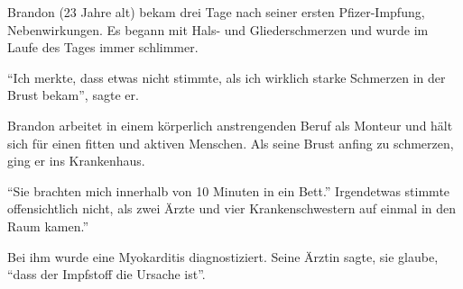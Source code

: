 Brandon (23 Jahre alt) bekam drei Tage nach seiner ersten Pfizer-Impfung,
Nebenwirkungen. Es begann mit Hals- und Gliederschmerzen und wurde im Laufe des
Tages immer schlimmer.

``Ich merkte, dass etwas nicht stimmte, als ich wirklich starke Schmerzen in der
Brust bekam'', sagte er.

Brandon arbeitet in einem körperlich anstrengenden Beruf als Monteur und hält
sich für einen fitten und aktiven Menschen. Als seine Brust anfing zu schmerzen,
ging er ins Krankenhaus.

``Sie brachten mich innerhalb von 10 Minuten in ein Bett.'' Irgendetwas stimmte
offensichtlich nicht, als zwei Ärzte und vier Krankenschwestern auf einmal in
den Raum kamen.''

Bei ihm wurde eine Myokarditis diagnostiziert. Seine Ärztin sagte, sie glaube,
``dass der Impfstoff die Ursache ist''.
